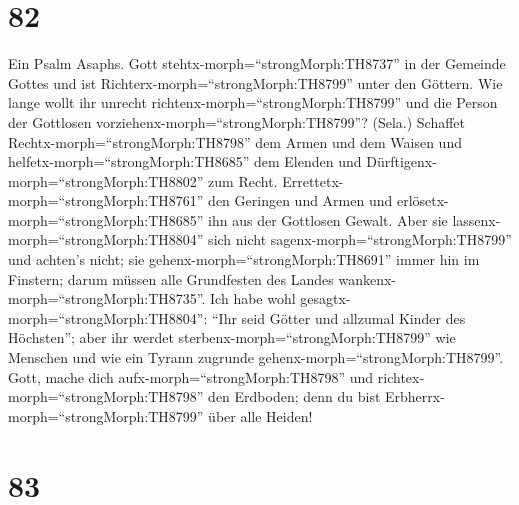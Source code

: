 \hypertarget{section-81}{%
\section{82}\label{section-81}}

 Ein Psalm Asaphs. Gott stehtx-morph=``strongMorph:TH8737''
in der Gemeinde Gottes und ist Richterx-morph=``strongMorph:TH8799''
unter den Göttern.  Wie lange wollt ihr unrecht
richtenx-morph=``strongMorph:TH8799'' und die Person der Gottlosen
vorziehenx-morph=``strongMorph:TH8799''? (Sela.)  Schaffet
Rechtx-morph=``strongMorph:TH8798'' dem Armen und dem Waisen und
helfetx-morph=``strongMorph:TH8685'' dem Elenden und
Dürftigenx-morph=``strongMorph:TH8802'' zum Recht. 
Errettetx-morph=``strongMorph:TH8761'' den Geringen und Armen und
erlösetx-morph=``strongMorph:TH8685'' ihn aus der Gottlosen Gewalt.
 Aber sie lassenx-morph=``strongMorph:TH8804'' sich nicht
sagenx-morph=``strongMorph:TH8799'' und achten's nicht; sie
gehenx-morph=``strongMorph:TH8691'' immer hin im Finstern; darum müssen
alle Grundfesten des Landes wankenx-morph=``strongMorph:TH8735''.
 Ich habe wohl gesagtx-morph=``strongMorph:TH8804'': ``Ihr
seid Götter und allzumal Kinder des Höchsten'';  aber ihr
werdet sterbenx-morph=``strongMorph:TH8799'' wie Menschen und wie ein
Tyrann zugrunde gehenx-morph=``strongMorph:TH8799''.  Gott,
mache dich aufx-morph=``strongMorph:TH8798'' und
richtex-morph=``strongMorph:TH8798'' den Erdboden; denn du bist
Erbherrx-morph=``strongMorph:TH8799'' über alle Heiden!

\hypertarget{section-82}{%
\section{83}\label{section-82}}

